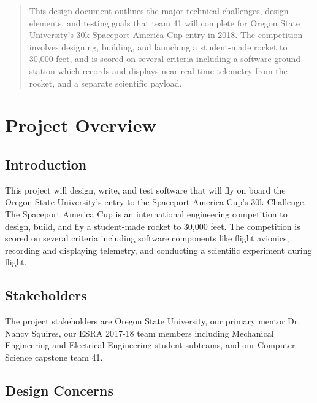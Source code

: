 \documentclass[onecolumn, draftclsnofoot, 10pt, compsoc]{IEEEtran}
\begin{document}
\begin{titlepage}
    \begin{abstract}
    This design document outlines the major technical challenges, design elements, and testing goals that team 41 will complete for Oregon State University's 30k Spaceport America Cup entry in 2018.  The competition involves designing, building, and launching a student-made rocket to 30,000 feet, and is scored on several criteria including a software ground station which records and displays near real time telemetry from the rocket, and a separate scientific payload.
	\end{abstract}
\end{titlepage}

\newpage



\tableofcontents


\section{Project Overview}

\subsection{Introduction}

This project will design, write, and test software that will fly on board the Oregon State University's entry to the Spaceport America Cup's 30k Challenge.  The Spaceport America Cup is an international engineering competition to design, build, and fly a student-made rocket to 30,000 feet.  The competition is scored on several criteria including software components like flight avionics, recording and displaying telemetry, and conducting a scientific experiment during flight.

\subsection{Stakeholders}

The project stakeholders are Oregon State University, our primary mentor Dr. Nancy Squires, our ESRA 2017-18 team members including Mechanical Engineering and Electrical Engineering student subteams, and our Computer Science capstone team 41.

\subsection{Design Concerns}
\end{document}
